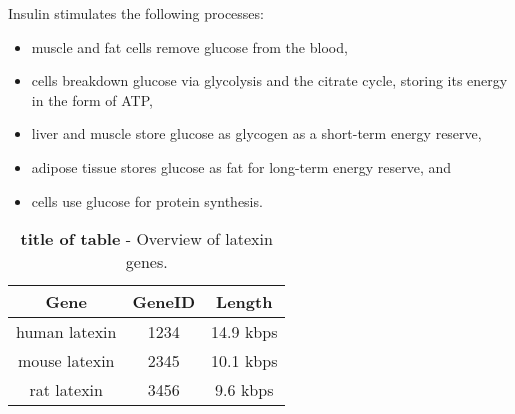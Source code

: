 




Insulin stimulates the following processes:

\begin{itemize}
\item muscle and fat cells remove glucose from the blood,
\item cells breakdown glucose via glycolysis and the citrate cycle, storing its energy in the form of ATP,
\item liver and muscle store glucose as glycogen as a short-term energy reserve,
\item adipose tissue stores glucose as fat for long-term energy reserve, and
\item cells use glucose for protein synthesis.
\end{itemize}



 



\begin{table}[htdp]
\centering
\begin{tabular}{ccc} %

{\bf Gene} & {\bf GeneID} & {\bf Length} \\ 
\hline %

human latexin & 1234 & 14.9 kbps \\
mouse latexin & 2345 & 10.1 kbps \\
rat latexin   & 3456 & 9.6 kbps \\

\end{tabular}
\caption[title of table]{\textbf{title of table} - Overview of latexin genes.}
\label{latexin_genes} %
\end{table}








